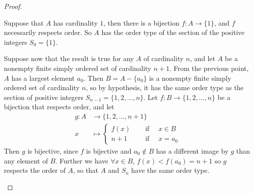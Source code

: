 \documentclass[11pt,a4paper,twoside]{article}
\theoremstyle{definition}
\begin{document}
\begin{proof}
\begin{enumerate}[(a)]
    Suppose that $A$ has cardinality $1$, then there is a bijection $f : A \to \{ 1 \}$, and $f$ necessarily respects order.
    So $A$ has the order type of the section of the positive integers $S_0 = \{ 1 \}$.

    Suppose now that the result is true for any $A$ of cardinality $n$,
    and let $A$ be a nonempty finite simply ordered set of cardinality $n + 1$.
    From the previous point, $A$ has a largest element $a_0$. Then $B = A - \{ a_0 \}$ is a nonempty finite simply ordered set of cardinality $n$,
    so by hypothesis, it has the same order type as the section of positive integers $S_{n - 1} = \{ 1, 2, \dotsc, n \}$.
    Let $f : B \to \{ 1, 2, \dotsc, n \}$ be a bijection that respects order, and let
    \begin{align*}
      g : A &\to \{ 1, 2, \dotsc, n + 1 \} \\
      x &\mapsto \begin{cases}
        f (x) &\quad\text{ if }\quad x \in B \\
        n + 1 &\quad\text{ if }\quad x = a_0
    \end{cases}
    \end{align*}
    Then $g$ is bijective, since $f$ is bijective and $a_0 \notin B$ has a different image by $g$ than any element of $B$.
    Further we have $\forall x \in B$, $f (x) < f (a_0) = n + 1$ so $g$ respects the order of $A$, so that $A$ and $S_n$ have the same order type.

  \end{enumerate}

\end{proof}
\end{document}
